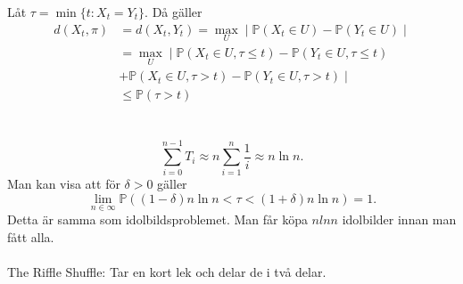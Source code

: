 Låt $\tau=\min\{t:X_t=Y_t\}$. Då gäller
\begin{align*}
	d(X_t,\pi)&=d(X_t,Y_t)=\max_{U}\mid \mathbb{P}(X_t \in U)-\mathbb{P}(Y_t\in U)\mid\\
	&=\max_{U}\mid \mathbb{P}(X_t \in U,\tau \leq t)-\mathbb{P}(Y_t\in U, \tau \leq t)\\
	&+\mathbb{P}(X_t \in U,\tau > t)-\mathbb{P}(Y_t\in U, \tau > t)\mid \\
	&\leq \mathbb{P}(\tau > t)
\end{align*}\\\\
$$\sum_{i=0}^{n-1}T_i \approx n\sum_{i=1}^{n}\frac{1}{i}\approx n \ln{n}.$$
Man kan visa att för $\delta >0$ gäller
$$\lim_{n\in \infty}\mathbb{P}((1-\delta)n\ln{n}<\tau < (1+\delta)n \ln{n})=1.$$
Detta är samma som idolbildsproblemet. Man får köpa $n ln n$ idolbilder innan man fått alla.\\\\
The Riffle Shuffle: Tar en kort lek och delar de i två delar.